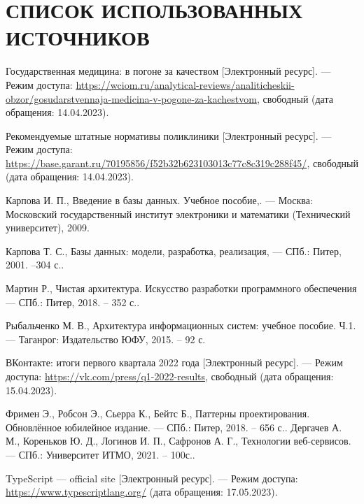 \section*{СПИСОК ИСПОЛЬЗОВАННЫХ ИСТОЧНИКОВ}

\begingroup
\renewcommand{\section}[2]{}

\begin{thebibliography}{}
	Государственная медицина: в погоне за качеством [Электронный ресурс]. --- Режим доступа: \url{https://wciom.ru/analytical-reviews/analiticheskii-obzor/gosudarstvennaja-medicina-v-pogone-za-kachestvom}, свободный (дата обращения: 14.04.2023).
	
	Рекомендуемые штатные нормативы поликлиники [Электронный ресурс]. --- Режим доступа: \url{https://base.garant.ru/70195856/f52b32b623103013c77c8c319c288f45/}, свободный (дата обращения: 14.04.2023).
	
	Карпова И. П., Введение в базы данных. Учебное пособие,. --- Москва: Московский государственный институт электроники и математики (Технический университет), 2009.
	
	Карпова Т. С., Базы данных: модели, разработка, реализация, --- СПб.: Питер, 2001. --304 с..
	
	Мартин Р., Чистая архитектура. Искусство разработки программного обеспечения --- СПб.: Питер, 2018. -- 352 с..
	
	Рыбальченко М. В., Архитектура информационных систем: учебное пособие. Ч.1. --- Таганрог: Издательство ЮФУ, 2015. -- 92 с.
	
	ВКонтакте: итоги первого квартала 2022 года [Электронный ресурс]. --- Режим доступа: \url{https://vk.com/press/q1-2022-results}, свободный (дата обращения: 15.04.2023).
	
	Фримен Э., Робсон Э., Сьерра К., Бейтс Б., Паттерны проектирования. Обновлённое юбилейное издание. --- СПб.: Питер, 2018. -- 656 с..
	Дергачев А. М., Кореньков Ю. Д., Логинов И. П., Сафронов А. Г., Технологии веб-сервисов. --- СПб.: Университет ИТМО, 2021. -- 100с..
	
	TypeScript --- official site [Электронный ресурс]. --- Режим доступа: \url{https://www.typescriptlang.org/} (дата обращения: 17.05.2023).


\end{thebibliography}
